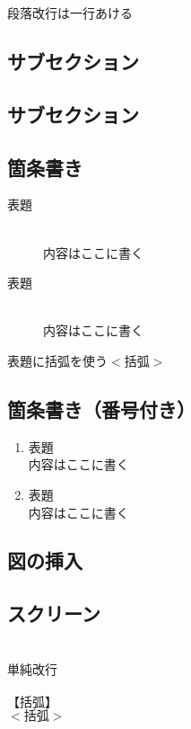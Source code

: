 \documentclass[a4j]{jarticle}
\begin{document}
段落改行は一行あける
\subsection{サブセクション}
\subsection{サブセクション}

\subsection{箇条書き}
\begin{description}
\item [表題]~\\
内容はここに書く
\item[表題]\mbox{}\\
内容はここに書く
\item[表題に括弧を使う$<$括弧$>$]
\end{description}

\subsection{箇条書き（番号付き）}
\begin{enumerate}
\item 表題　~\\
内容はここに書く 
\item 表題　\mbox{}\\
内容はここに書く 
\end{enumerate}

\subsection{図の挿入}

\subsection{スクリーン}
\begin{screen}
\\
単純改行\\
\\
$【括弧】$\\
$<括弧>$ \\
\end{screen}
\end{document}
